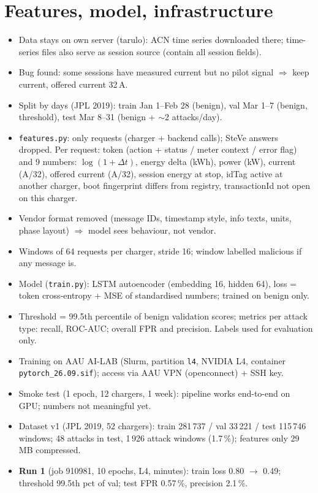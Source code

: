 \documentclass[11pt]{article}
\begin{document}
\section{Features, model, infrastructure}
\begin{itemize}
  \item Data stays on own server (tarulo): ACN time series downloaded there; time-series files also serve as session source (contain all session fields).
  \item Bug found: some sessions have measured current but no pilot signal $\Rightarrow$ keep current, offered current 32\,A.
  \item Split by days (JPL 2019): train Jan 1--Feb 28 (benign), val Mar 1--7 (benign, threshold), test Mar 8--31 (benign + $\sim$2 attacks/day).
  \item \texttt{features.py}: only requests (charger + backend calls); SteVe answers dropped. Per request: token (action + status / meter context / error flag) and 9 numbers: $\log(1+\Delta t)$, energy delta (kWh), power (kW), current (A/32), offered current (A/32), session energy at stop, idTag active at another charger, boot fingerprint differs from registry, transactionId not open on this charger.
  \item Vendor format removed (message IDs, timestamp style, info texts, units, phase layout) $\Rightarrow$ model sees behaviour, not vendor.
  \item Windows of 64 requests per charger, stride 16; window labelled malicious if any message is.
  \item Model (\texttt{train.py}): LSTM autoencoder (embedding 16, hidden 64), loss = token cross-entropy + MSE of standardised numbers; trained on benign only.
  \item Threshold = 99.5th percentile of benign validation scores; metrics per attack type: recall, ROC-AUC; overall FPR and precision. Labels used for evaluation only.
  \item Training on AAU AI-LAB (Slurm, partition \texttt{l4}, NVIDIA L4, container \texttt{pytorch\_26.09.sif}); access via AAU VPN (openconnect) + SSH key.
  \item Smoke test (1 epoch, 12 chargers, 1 week): pipeline works end-to-end on GPU; numbers not meaningful yet.
  \item Dataset v1 (JPL 2019, 52 chargers): train 281\,737 / val 33\,221 / test 115\,746 windows; 48 attacks in test, 1\,926 attack windows (1.7\,\%); features only 29\,MB compressed.
  \item \textbf{Run 1} (job 910981, 10 epochs, L4, minutes): train loss 0.80 $\to$ 0.49; threshold 99.5th pct of val; test FPR 0.57\,\%, precision 2.1\,\%.

\end{itemize}
\end{document}
